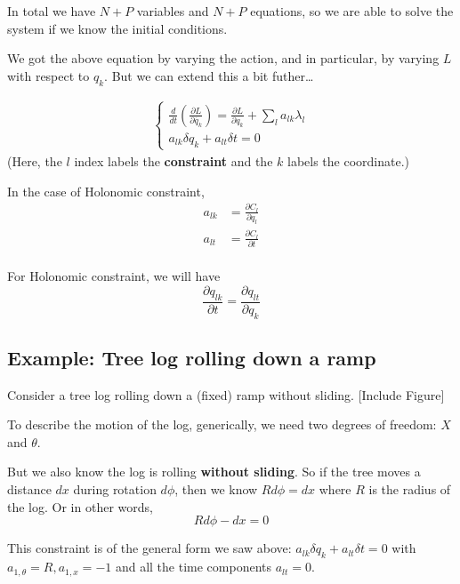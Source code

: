 \documentclass[11pt]{article}
\begin{document}
\vskip 0.5cm
In total we have $N+P$ variables and $N+P$ equations, so we are able to solve the system if we know the initial conditions.

\vskip 0.5cm
We got the above equation by varying the action, and in particular, by varying $L$ with respect to $q_k$. But we can extend this a bit futher\dots

\begin{align*}
  \begin{cases}
    \frac{d}{dt} \left( \frac{\partial L}{\partial \dot{q_{k}}}  \right)= \frac{\partial L}{\partial q_{k}} + \sum_{l} a_{lk} \lambda_{l} \\
    a_{lk} \delta q_{k} + a_{lt} \delta t = 0
  \end{cases}
\end{align*}
(Here, the $l$ index labels the \textbf{constraint} and the $k$ labels the coordinate.)

\begin{redbox}
  In the case of Holonomic constraint,
  \begin{align*}
    a_{lk} &= \frac{\partial C_l}{\partial q_{l}} \\
    a_{lt} &= \frac{\partial C_l}{\partial t} \\
  \end{align*}
\end{redbox}

\vskip 0.5cm
For Holonomic constraint, we will have 
\[ \frac{\partial q_{lk}}{\partial t} = \frac{\partial q_{lt}}{\partial q_{k}} \]








\subsection{Example: Tree log rolling down a ramp}

Consider a tree log rolling down a (fixed) ramp without sliding.
\vskip 0.5cm
[Include Figure]

\vskip 0.5cm
To describe the motion of the log, generically, we need two degrees of freedom: $X$ and $\theta$.

\vskip 0.5cm
But we also know the log is rolling \textbf{without sliding}. So if the tree moves a distance $dx$ during rotation $d\phi$, then we know $Rd\phi = dx$
where $R$ is the radius of the log. Or in other words,
\[ R d\phi - dx = 0 \]

\vskip 0.5cm
This constraint is of the general form we saw above: 
$ \boxed{a_{lk} \delta q_{k} + a_{lt} \delta t = 0 }$
with $a_{1,\theta} = R, a_{1, x} = -1$ and all the time components $a_{lt} = 0$.
\end{document}
